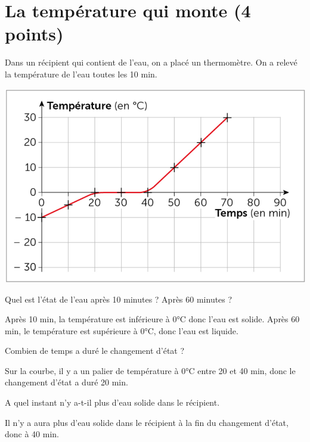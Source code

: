 \section{La température qui monte (4 points)}\label{ex:fusion}

Dans un récipient qui contient de l'eau, on a placé un thermomètre. On a relevé la température de l'eau toutes les 10 min.

\begin{center}
	\includegraphics[scale=0.4]{./img/courbe}
\end{center}

\begin{questions}
	\question[2] Quel est l'état de l'eau après 10 minutes ? Après 60 minutes ?
	\begin{solution}
		Après 10 min, la température est inférieure à 0°C donc l'eau est solide. Après 60 min, le température est supérieure à 0°C, donc l'eau est liquide.
	\end{solution}
	
	\question[1] Combien de temps a duré le changement d'état ?
	\begin{solution}
		Sur la courbe, il y a un palier de température à 0°C entre 20 et 40 min, donc le changement d'état a duré 20 min.
	\end{solution}
	
	\question[1] A quel instant n'y a-t-il plus d'eau solide dans le récipient. 
	\begin{solution}
		Il n'y a aura plus d'eau solide dans le récipient à la fin du changement d'état, donc à 40 min.
	\end{solution}
\end{questions}
